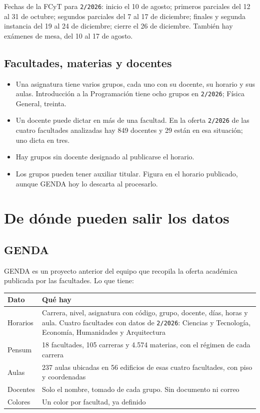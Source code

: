 \documentclass[11pt,letterpaper]{article}
\begin{document}
Fechas de la FCyT para \texttt{2/2026}: inicio el 10 de agosto; primeros parciales del 12
al 31 de octubre; segundos parciales del 7 al 17 de diciembre; finales y segunda
instancia del 19 al 24 de diciembre; cierre el 26 de diciembre. También hay exámenes de
mesa, del 10 al 17 de agosto.

\subsection{Facultades, materias y docentes}

\begin{itemize}
  \item Una asignatura tiene varios grupos, cada uno con su docente, su horario y sus
        aulas. Introducción a la Programación tiene ocho grupos en \texttt{2/2026};
        Física General, treinta.
  \item Un docente puede dictar en más de una facultad. En la oferta \texttt{2/2026} de
        las cuatro facultades analizadas hay 849 docentes y 29 están en esa situación;
        uno dicta en tres.
  \item Hay grupos sin docente designado al publicarse el horario.
  \item Los grupos pueden tener auxiliar titular. Figura en el horario publicado, aunque
        GENDA hoy lo descarta al procesarlo.
\end{itemize}

\section{De dónde pueden salir los datos}

\subsection{GENDA}

GENDA es un proyecto anterior del equipo que recopila la oferta académica publicada por
las facultades. Lo que tiene:

\begin{center}
\begin{tabular}{@{}L{4.2cm}L{11.6cm}@{}}
\hline
\textbf{Dato} & \textbf{Qué hay} \\
\hline
Horarios & Carrera, nivel, asignatura con código, grupo, docente, días, horas y aula. Cuatro facultades con datos de \texttt{2/2026}: Ciencias y Tecnología, Economía, Humanidades y Arquitectura \\
Pensum & 18 facultades, 105 carreras y 4.574 materias, con el régimen de cada carrera \\
Aulas & 237 aulas ubicadas en 56 edificios de esas cuatro facultades, con piso y coordenadas \\
Docentes & Solo el nombre, tomado de cada grupo. Sin documento ni correo \\
Colores & Un color por facultad, ya definido \\
\hline
\end{tabular}
\end{center}
\end{document}
